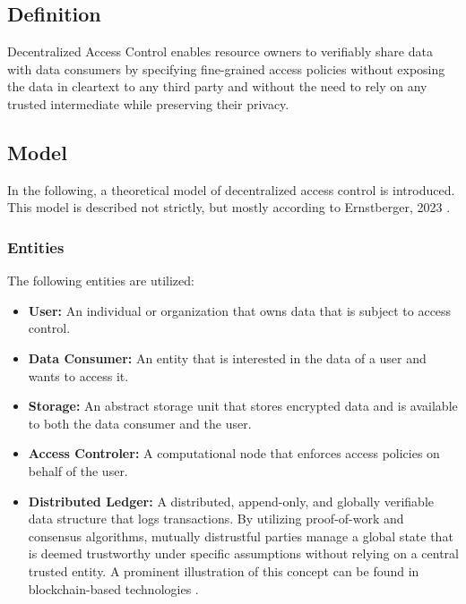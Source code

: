\documentclass[conference]{IEEEtran}
\begin{document}
\subsection{Definition}
Decentralized Access Control enables resource owners to verifiably share data with data consumers by specifying fine-grained access policies without exposing the data in cleartext to any third party and without the need to rely on any trusted intermediate while preserving their privacy.

\subsection{Model}
In the following, a theoretical model of decentralized access control is introduced.
This model is described not strictly, but mostly according to Ernstberger, 2023 \cite{ernstberger_sok_2023}.

\subsubsection{Entities}
The following entities are utilized:

\begin{itemize}
  \item \textbf{User:} An individual or organization that owns data that is subject to access control.
  \item \textbf{Data Consumer:} An entity that is interested in the data of a user and wants to access it.
  \item \textbf{Storage:} An abstract storage unit that stores encrypted data and is available to both the data consumer and the user.
  \item \textbf{Access Controler:} A computational node that enforces access policies on behalf of the user.
  \item \textbf{Distributed Ledger:} A distributed, append-only, and globally verifiable data structure that logs transactions.
  By utilizing proof-of-work and consensus algorithms, mutually distrustful parties manage a global state that is deemed trustworthy under specific assumptions without relying on a central trusted entity.
  A prominent illustration of this concept can be found in blockchain-based technologies \cite{zheng_overview_2017}.
\end{itemize}
\end{document}
